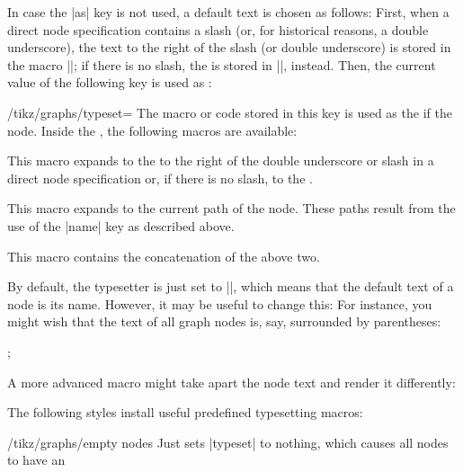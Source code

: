 \begin{itemize}
  In case the |as| key is not used, a default text
  is chosen as follows: First, when a direct node specification
  contains a slash (or, for historical reasons, a double underscore),
  the text to the right of the slash (or double underscore) is stored
  in the macro |\tikzgraphnodetext|; if 
  there is no slash, the  is stored in
  |\tikzgraphnodetext|, instead. Then, the current value of the
  following key is used as :
  \begin{key}{/tikz/graphs/typeset=}
    The macro or code stored in this key is used as the
     if the node. Inside the , the following
    macros are available:
    \begin{command}{\tikzgraphnodetext}
      This macro expands to the  to the right of the double
      underscore or slash in a direct node specification or, if there
      is no slash, to the .
    \end{command}
    \begin{command}{\tikzgraphnodepath}
      This macro expands to the current path of the node. These
      paths result from the use of the |name| key as described above.
    \end{command}
    \begin{command}{\tikzgraphnodefullname}
      This macro contains the concatenation of the above two.
    \end{command}
  \end{key}
  By default, the typesetter is just set to |\tikzgraphnodetext|,
  which means that the default text of a node is its name. However,
  it may be useful to change this: For instance, you might wish that
  the text of all graph nodes is, say, surrounded by parentheses:
  \begin{codeexample}[]
\tikz {};
  \end{codeexample}
  A more advanced macro might take apart the node text and render it
  differently: 
  The following styles install useful predefined typesetting macros:
  \begin{key}{/tikz/graphs/empty nodes}
    Just sets |typeset| to nothing, which causes all nodes to have an

\end{key}
\end{itemize}
